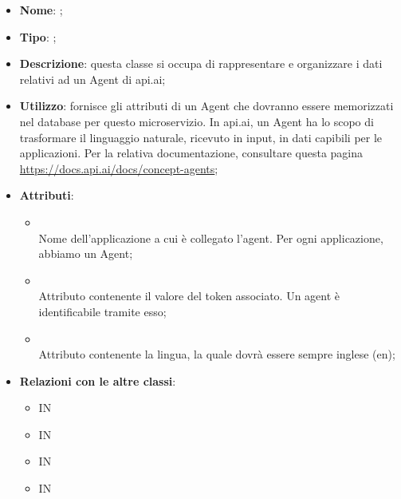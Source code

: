 \begin{itemize}
	\item \textbf{Nome}: ;
	\item \textbf{Tipo}: ;
	\item \textbf{Descrizione}: questa classe si occupa di rappresentare e organizzare i dati relativi ad un Agent di api.ai;
	\item \textbf{Utilizzo}: fornisce gli attributi di un Agent che dovranno essere memorizzati nel database per questo microservizio.
In api.ai, un Agent ha lo scopo di trasformare il linguaggio naturale, ricevuto in input, in dati capibili per le applicazioni.
Per la relativa documentazione, consultare questa pagina \url{https://docs.api.ai/docs/concept-agents};
	\item \textbf{Attributi}:
	\begin{itemize}
		\item[]  \\
		Nome dell'applicazione a cui è collegato l'agent.
Per ogni applicazione, abbiamo un Agent;
		\item[]  \\
		Attributo contenente il valore del token associato. Un agent è identificabile tramite esso;
		\item[]  \\
		Attributo contenente la lingua, la quale dovrà essere sempre inglese (en);
	\end{itemize}
	\item \textbf{Relazioni con le altre classi}:
	\begin{itemize}
		\item IN \hyperlink{<<interface>> AgentsDAO_label}{}
		\item IN \hyperlink{AgentObserver_label}{}
		\item IN \hyperlink{AgentsDAODynamoDB_label}{}
		\item IN \hyperlink{ApiAiVAAdapter_label}{}
	\end{itemize}
\end{itemize}
\FloatBarrier

